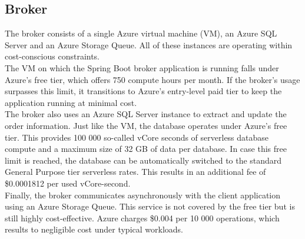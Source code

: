 \documentclass[10pt,a4paper,kul]{kulakarticle} %
\begin{document}
		\subsection{Broker}
		The broker consists of a single Azure virtual machine (VM), an Azure SQL Server and an Azure Storage Queue. All of these instances are operating within cost-conscious constraints. \\		
		The VM on which the Spring Boot broker application is running falls under Azure’s free tier, which offers 750 compute hours per month. If the broker’s usage surpasses this limit, it transitions to Azure’s entry-level paid tier to keep the application running at minimal cost. \\		
		The broker also uses an Azure SQL Server instance to extract and update the order information. Just like the VM, the database operates under Azure’s free tier. This provides 100 000 so-called vCore seconds of serverless database compute and a maximum size of 32 GB of data per database. In case this free limit is reached, the database can be automatically switched to the standard General Purpose tier serverless rates. This results in an additional fee of \$0.0001812 per used vCore-second. \\		
		Finally, the broker communicates asynchronously with the client application using an Azure Storage Queue. This service is not covered by the free tier but is still highly cost-effective. Azure charges \$0.004 per 10 000 operations, which results to negligible cost under typical workloads.
	
\end{document}
